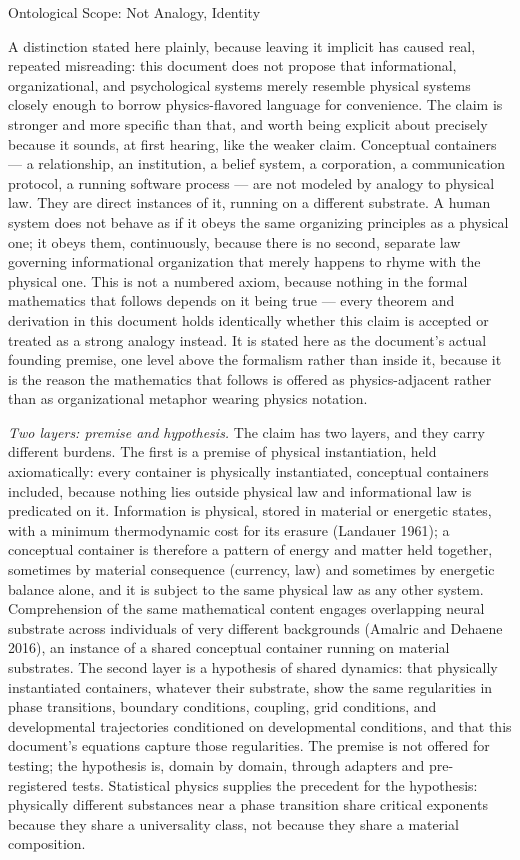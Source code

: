 \documentclass[
]{article}
\begin{document}
Ontological Scope: Not Analogy, Identity

A distinction stated here plainly, because leaving it implicit has
caused real, repeated misreading: this document does not propose that
informational, organizational, and psychological systems merely resemble
physical systems closely enough to borrow physics-flavored language for
convenience. The claim is stronger and more specific than that, and
worth being explicit about precisely because it sounds, at first
hearing, like the weaker claim. Conceptual containers --- a
relationship, an institution, a belief system, a corporation, a
communication protocol, a running software process --- are not modeled
by analogy to physical law. They are direct instances of it, running on
a different substrate. A human system does not behave as if it obeys the
same organizing principles as a physical one; it obeys them,
continuously, because there is no second, separate law governing
informational organization that merely happens to rhyme with the
physical one. This is not a numbered axiom, because nothing in the
formal mathematics that follows depends on it being true --- every
theorem and derivation in this document holds identically whether this
claim is accepted or treated as a strong analogy instead. It is stated
here as the document's actual founding premise, one level above the
formalism rather than inside it, because it is the reason the
mathematics that follows is offered as physics-adjacent rather than as
organizational metaphor wearing physics notation.

\emph{Two layers: premise and hypothesis.} The claim has two layers, and
they carry different burdens. The first is a premise of physical
instantiation, held axiomatically: every container is physically
instantiated, conceptual containers included, because nothing lies
outside physical law and informational law is predicated on it.
Information is physical, stored in material or energetic states, with a
minimum thermodynamic cost for its erasure (Landauer 1961); a conceptual
container is therefore a pattern of energy and matter held together,
sometimes by material consequence (currency, law) and sometimes by
energetic balance alone, and it is subject to the same physical law as
any other system. Comprehension of the same mathematical content engages
overlapping neural substrate across individuals of very different
backgrounds (Amalric and Dehaene 2016), an instance of a shared
conceptual container running on material substrates. The second layer is
a hypothesis of shared dynamics: that physically instantiated
containers, whatever their substrate, show the same regularities in
phase transitions, boundary conditions, coupling, grid conditions, and
developmental trajectories conditioned on developmental conditions, and
that this document's equations capture those regularities. The premise
is not offered for testing; the hypothesis is, domain by domain, through
adapters and pre-registered tests. Statistical physics supplies the
precedent for the hypothesis: physically different substances near a
phase transition share critical exponents because they share a
universality class, not because they share a material composition.
\end{document}

